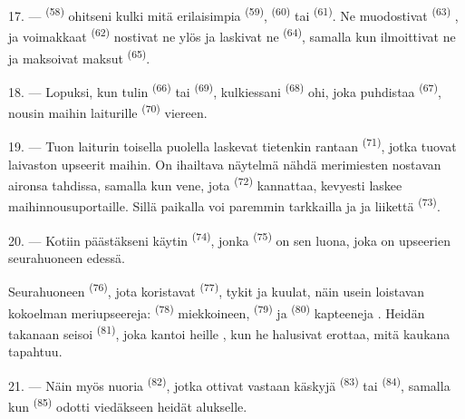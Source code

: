 17. ---  \textsuperscript{(58)} ohitseni kulki mitä
erilaisimpia  \textsuperscript{(59)},
 \textsuperscript{(60)} tai 
\textsuperscript{(61)}. Ne muodostivat  \textsuperscript{(63)}
, ja voimakkaat 
\textsuperscript{(62)} nostivat ne ylös ja laskivat ne
 \textsuperscript{(64)}, samalla kun 
ilmoittivat ne ja maksoivat maksut 
\textsuperscript{(65)}.

18. --- Lopuksi, kun tulin  \textsuperscript{(66)} tai
 \textsuperscript{(69)}, kulkiessani 
\textsuperscript{(68)} ohi, joka puhdistaa 
\textsuperscript{(67)}, nousin maihin laiturille 
\textsuperscript{(70)} viereen.

19. --- Tuon laiturin toisella puolella laskevat tietenkin rantaan
 \textsuperscript{(71)}, jotka tuovat laivaston upseerit maihin.
On ihailtava näytelmä nähdä merimiesten nostavan aironsa tahdissa, samalla kun
vene, jota  \textsuperscript{(72)} kannattaa, kevyesti laskee
maihinnousuportaille. Sillä paikalla voi paremmin tarkkailla 
ja  ja  liikettä 
\textsuperscript{(73)}.

\VUsaut{3.0mm}
\VUsaut{3.0mm}

20. --- Kotiin päästäkseni käytin 
\textsuperscript{(74)}, jonka  \textsuperscript{(75)} on sen
 luona, joka on upseerien seurahuoneen edessä.

Seurahuoneen  \textsuperscript{(76)}, jota koristavat
 \textsuperscript{(77)}, tykit ja kuulat, näin usein loistavan
kokoelman meriupseereja:  \textsuperscript{(78)}
miekkoineen,  \textsuperscript{(79)} ja
 \textsuperscript{(80)} kapteeneja .
Heidän takanaan seisoi  \textsuperscript{(81)}, joka kantoi
heille , kun he halusivat erottaa, mitä kaukana tapahtuu.

21. --- Näin myös nuoria  \textsuperscript{(82)}, jotka
ottivat vastaan käskyjä  \textsuperscript{(83)} tai
 \textsuperscript{(84)}, samalla kun 
\textsuperscript{(85)} odotti viedäkseen heidät alukselle.

